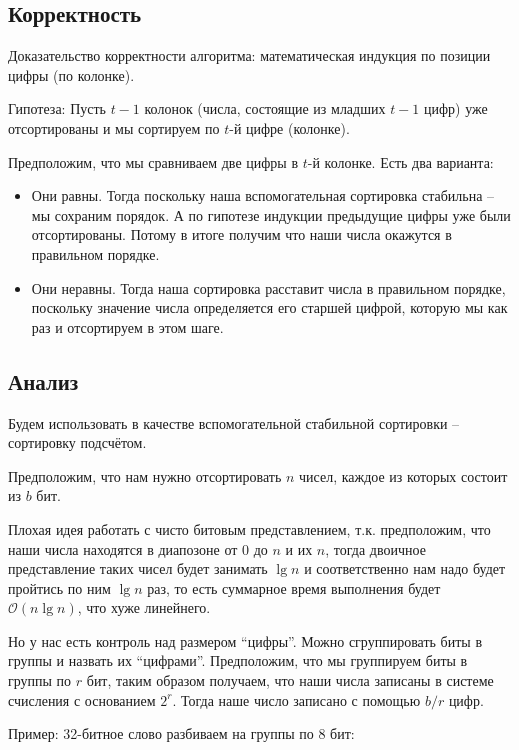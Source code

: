 \documentclass[a4paper,11pt]{article}
\begin{document}
\subsection{Корректность}

Доказательство корректности алгоритма: математическая индукция по позиции цифры
(по колонке).

Гипотеза: Пусть $t-1$ колонок (числа, состоящие из младших $t-1$ цифр) уже
отсортированы и мы сортируем по $t$-й цифре (колонке).

Предположим, что мы сравниваем две цифры в $t$-й колонке. Есть два варианта:

\begin{itemize}
\item Они равны. Тогда поскольку наша вспомогательная сортировка стабильна --
  мы сохраним порядок. А по гипотезе индукции предыдущие цифры уже были
  отсортированы. Потому в итоге получим что наши числа окажутся в правильном
  порядке.
\item Они неравны. Тогда наша сортировка расставит числа в правильном порядке,
  поскольку значение числа определяется его старшей цифрой, которую мы как раз и
  отсортируем в этом шаге.
\end{itemize}

\subsection{Анализ}
Будем использовать в качестве вспомогательной стабильной сортировки --
сортировку подсчётом.

Предположим, что нам нужно отсортировать $n$ чисел, каждое из которых состоит из
$b$ бит.

Плохая идея работать с чисто битовым представлением, т.к. предположим, что наши
числа находятся в диапозоне от $0$ до $n$ и их $n$, тогда двоичное представление
таких чисел будет занимать $\lg n$ и соответственно нам надо будет пройтись по
ним $\lg n$ раз, то есть суммарное время выполнения будет $\mathcal{O}(n \lg
n)$, что хуже линейнего.

Но у нас есть контроль над размером ``цифры''. Можно сгруппировать биты в группы
и назвать их ``цифрами''. Предположим, что мы группируем биты в группы по $r$
бит, таким образом получаем, что наши числа записаны в системе счисления с
основанием $2^r$. Тогда наше число записано с помощью $b/r$ цифр.

Пример: 32-битное слово разбиваем на группы по 8 бит:
\end{document}
